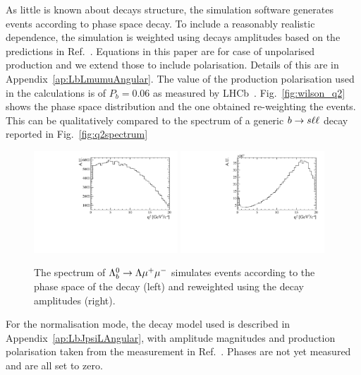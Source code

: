 As little is known about \Lb decays structure, the simulation software generates events
according to phase space decay. To include a reasonably realistic \qsq dependence,
the simulation is weighted using decays amplitudes based on the predictions in Ref.~\cite{Gutsche:2013pp}.
Equations in this paper are for case of unpolarised production and we extend those to include polarisation.
Details of this are in Appendix~\ref{ap:LbLmumuAngular}. The value of the \Lb production polarisation 
used in the calculations is of $P_b = 0.06$ as measured by LHCb~\cite{Aaij:2013oxa}. 
Fig.~\ref{fig:wilson_q2} shows the phase space \qsq distribution and the one obtained re-weighting the events.
This can be qualitatively compared to the \qsq spectrum of a generic ${b}\rightarrow{\ensuremath{s}}\ell\ell$ decay
reported in Fig.~\ref{fig:q2spectrum}
%
\begin{figure}
\centering
\includegraphics[width=0.48\textwidth]{Lmumu/figs/Q2_beforemodel.pdf}
\includegraphics[width=0.48\textwidth]{Lmumu/figs/Q2_aftermodel.pdf}
\caption{The \qsq spectrum of ${{\Lambda}^0_{b}}\rightarrow{\ensuremath{\Lambda}}{\ensuremath{\mu^+\mu^-}}$ simulates events according to the
phase space of the decay (left) and reweighted using the decay amplitudes (right).}
\label{fig:decaymodeleffonq2}
\end{figure}
%
For the normalisation mode, the decay model used is described in Appendix~\ref{ap:LbJpsiLAngular},
with amplitude magnitudes and production polarisation taken from the measurement in
Ref.~\cite{Aaij:2013oxa}. Phases are not yet measured and are all set to zero.

